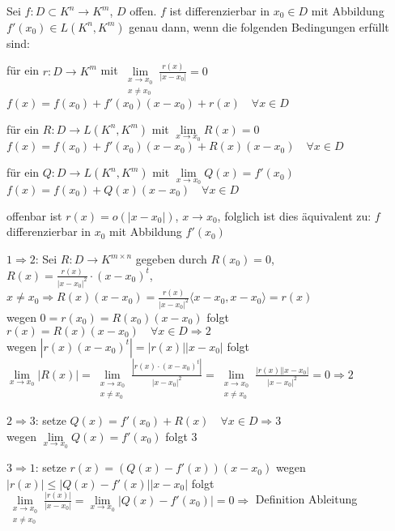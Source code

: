 	\begin{satz}\label{satz:diffbar_abb}
		Sei $f:D\subset K^n \to K^m$, $D$ offen. $f$ ist differenzierbar in $x_0\in D$ mit Abbildung $f'(x_0)\in L(K^n,K^m)$ genau dann, wenn die folgenden Bedingungen erfüllt sind:
		\begin{compactitem}
			\item für ein $r:D\to K^m$ mit $\lim\limits_{\substack{x\to x_0 \\ x\neq x_0}} 
			\frac{r(x)}{|x-x_0|}=0$ \\
			$f(x)=f(x_0)+f'(x_0)(x-x_0)+r(x)\quad\forall x\in D$
			\item für ein $R:D\to L(K^n,K^m)$ mit $\lim\limits_{x\to x_0} R(x)=0$ \\
			$f(x)=f(x_0)+f'(x_0)(x-x_0)+R(x)(x-x_0)\quad\forall x\in D$
			\item für ein $Q:D\to L(K^n,K^m)$ mit $\lim\limits_{x\to x_0} Q(x)=f'(x_0)$ \\
			$f(x)=f(x_0)+Q(x)(x-x_0)\quad\forall x\in D$
		\end{compactitem}
	\end{satz}
	\begin{beweis}
		\begin{compactitem}
			\item offenbar ist $r(x)=o(|x-x_0|)$, $x\to x_0$, folglich ist dies äquivalent zu: $f$ 
			differenzierbar in $x_0$ mit Abbildung $f'(x_0)$
			\item $1\Rightarrow 2$: Sei $R:D\to K^{m\times n}$ gegeben durch $R(x_0)=0$, $R(x)=
			\frac{r(x)}{|x-x_0|^2}\cdot (x-x_0)^t$, $x\neq x_0 \Rightarrow R(x)(x-x_0)=\frac{r(x)}
			{|x-x_0|^2}\langle x-x_0,x-x_0\rangle=r(x)$ \\
			wegen $0=r(x_0)=R(x_0)(x-x_0)$ folgt $r(x)=R(x)(x-x_0)\quad\forall x\in D\Rightarrow 2$ \\
			wegen $|r(x)(x-x_0)^t|=|r(x)||x-x_0|$ folgt $\lim\limits_{x\to x_0} |R(x)|=\lim\limits_
			{\substack{x\to x_0 \\ x\neq x_0}} \frac{|r(x)\cdot (x-x_0)^t|}{|x-x_0|^2}=\lim\limits_
			{\substack{x\to x_0 \\ x\neq x_0}} \frac{|r(x)||x-x_0|}{|x-x_0|^2}=0\Rightarrow 2$
			\item $2\Rightarrow 3$: setze $Q(x)=f'(x_0)+R(x)\quad\forall x\in D\Rightarrow 3$ \\
			wegen $\lim\limits_{x\to x_0} Q(x)=f'(x_0)$ folgt 3
			\item $3\Rightarrow 1$: setze $r(x)=(Q(x)-f'(x))(x-x_0)$ wegen $|r(x)|\le |Q(x)-f'(x)||x-x_0|$ 
			folgt $\lim\limits_{\substack{x\to x_0 \\ x\neq x_0}} \frac{|r(x)|}{|x-x_0|}=\lim\limits_{x\to x_0} 
			|Q(x)-f'(x_0)|=0\Rightarrow$ Definition Ableitung
		\end{compactitem}
	\end{beweis}

